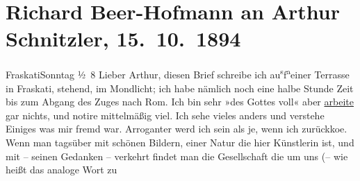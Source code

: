 

         
         \renewcommand{\erwaehntePersonen}{Personen: Richard Beer-Hofmann}
         \renewcommand{\erwaehnteOrte}{Orte: Frascati, Neapel, Rom, Wien}
         \renewcommand{\erwaehnteWerke}{Werke: Die Kraniche des Ibykus}
               \section[Richard Beer-Hofmann an Arthur Schnitzler, 15. 10. 1894]{ Richard Beer-Hofmann an Arthur Schnitzler, 15. 10. 1894}\nopagebreak{}\rehead{ }\begin{ledgroupsized}[t]{13cm}\normalsize\beginnumbering \toendnotes[C]{\smallbreak\pagebreak[2]} 
\toendnotes[C]{\smallbreak}\pstart
           \raggedleft{}{\pb}FraskatiSonntag{ }½ 8\pend
           \pstart
           {\pb}Lieber Arthur, diesen Brief schreibe ich au\substVorne{}\textsuperscript{s}\substDazwischen{}f\substHinten{}{ }\substVorne{}\textsuperscript{a}\substDazwischen{}e\substHinten{}iner Terrasse  in Fraskati, stehend, im Mondlicht; ich habe nämlich noch eine
               halbe Stunde Zeit bis zum Abgang des Zuges nach Rom. {\pb}Ich bin sehr »des Gottes voll« aber \uline{arbeite} gar nichts, und notire mittelmäßig viel. Ich
               sehe vieles anders und verstehe Einiges was mir fremd war. Arroganter werd ich {\pb}sein als je, wenn ich zurückko{\geminationm}e. Wenn man tagsüber mit schönen Bildern, einer Natur
               die hier Künstlerin ist, und mit – seinen Gedanken – verkehrt {\pb}findet man die Gesellschaft die um
               uns (– wie heißt das analoge Wort zu\pend
           \settowidth{\longeste}{crepiren!}\settowidth{\longestz}{–}\settowidth{\longestd}{sterben}\settowidth{\longestv}{}\settowidth{\longestf}{}\addtolength\longeste{1em}

\end{ledgroupsized}
